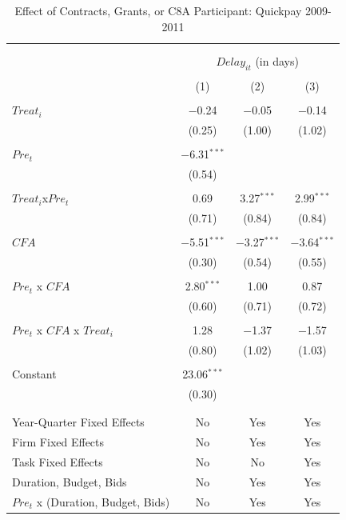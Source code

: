 \documentclass[
]{article}
\begin{document}
\begin{table}[H] \centering 
  \caption{Effect of Contracts, Grants, or C8A Participant: Quickpay 2009-2011} 
  \label{} 
\small 
\begin{tabular}{@{\extracolsep{-2pt}}lccc} 
\\[-1.8ex]\hline 
\hline \\[-1.8ex] 
\\[-1.8ex] & \multicolumn{3}{c}{$Delay_{it}$ (in days)} \\ 
\\[-1.8ex] & (1) & (2) & (3)\\ 
\hline \\[-1.8ex] 
 $Treat_i$ & $-$0.24 & $-$0.05 & $-$0.14 \\ 
  & (0.25) & (1.00) & (1.02) \\ 
  & & & \\ 
 $Pre_t$ & $-$6.31$^{***}$ &  &  \\ 
  & (0.54) &  &  \\ 
  & & & \\ 
 $Treat_i$x$Pre_t$ & 0.69 & 3.27$^{***}$ & 2.99$^{***}$ \\ 
  & (0.71) & (0.84) & (0.84) \\ 
  & & & \\ 
 $CFA$ & $-$5.51$^{***}$ & $-$3.27$^{***}$ & $-$3.64$^{***}$ \\ 
  & (0.30) & (0.54) & (0.55) \\ 
  & & & \\ 
 $Pre_t$ x $CFA$ & 2.80$^{***}$ & 1.00 & 0.87 \\ 
  & (0.60) & (0.71) & (0.72) \\ 
  & & & \\ 
 $Pre_t$ x $CFA$ x $Treat_i$ & 1.28 & $-$1.37 & $-$1.57 \\ 
  & (0.80) & (1.02) & (1.03) \\ 
  & & & \\ 
 Constant & 23.06$^{***}$ &  &  \\ 
  & (0.30) &  &  \\ 
  & & & \\ 
\hline \\[-1.8ex] 
Year-Quarter Fixed Effects & No & Yes & Yes \\ 
Firm Fixed Effects & No & Yes & Yes \\ 
Task Fixed Effects & No & No & Yes \\ 
Duration, Budget, Bids & No & Yes & Yes \\ 
$Pre_t$  x  (Duration, Budget, Bids) & No & Yes & Yes \\ 

\end{tabular}
\end{table}
\end{document}
